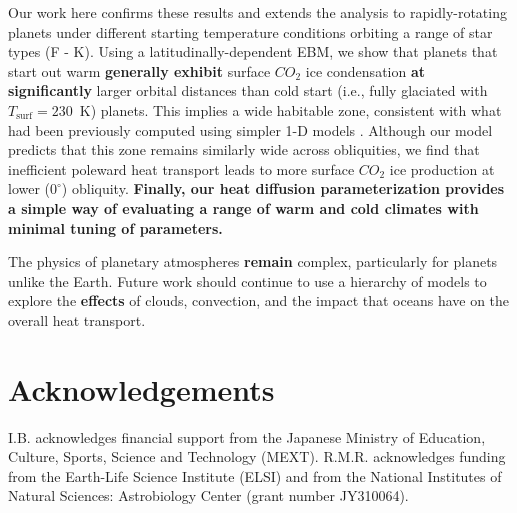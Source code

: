 \documentclass[fleqn,usenatbib]{mnras}
\providecommand{\DIFadd}[1]{{\bf #1}} %
\providecommand{\DIFdel}[1]{} %
\providecommand{\DIFaddbegin}{} %
\providecommand{\DIFaddend}{} %
\providecommand{\DIFdelbegin}{} %
\providecommand{\DIFdelend}{} %
\newcommand{\DIFscaledelfig}{0.5}
\newlength{\DIFdelgraphicswidth} %
\newlength{\DIFdelgraphicsheight} %
\newcommand{\DIFaddincludegraphics}[2][]{{\color{blue}\fbox{\DIFOincludegraphics[#1]{#2}}}} %
\newcommand{\DIFdelincludegraphics}[2][]{%
\sbox{\DIFdelgraphicsbox}{\DIFOincludegraphics[#1]{#2}}%
\settoboxwidth{\DIFdelgraphicswidth}{\DIFdelgraphicsbox} %
\settoboxtotalheight{\DIFdelgraphicsheight}{\DIFdelgraphicsbox} %
\scalebox{\DIFscaledelfig}{%
\parbox[b]{\DIFdelgraphicswidth}{\usebox{\DIFdelgraphicsbox}\\[-\baselineskip] \rule{\DIFdelgraphicswidth}{0em}}\llap{\resizebox{\DIFdelgraphicswidth}{\DIFdelgraphicsheight}{%
\setlength{\unitlength}{\DIFdelgraphicswidth}%
\begin{picture}(1,1)%
\thicklines\linethickness{2pt} %
{\color[rgb]{1,0,0}\put(0,0){\framebox(1,1){}}}%
{\color[rgb]{1,0,0}\put(0,0){\line( 1,1){1}}}%
{\color[rgb]{1,0,0}\put(0,1){\line(1,-1){1}}}%
\end{picture}%
}\hspace*{3pt}}} %
} %
\DeclareRobustCommand{\DIFaddbegin}{\DIFOaddbegin \let\includegraphics\DIFaddincludegraphics} %
\DeclareRobustCommand{\DIFaddend}{\DIFOaddend \let\includegraphics\DIFOincludegraphics} %
\DeclareRobustCommand{\DIFdelbegin}{\DIFOdelbegin \let\includegraphics\DIFdelincludegraphics} %
\DeclareRobustCommand{\DIFdelend}{\DIFOaddend \let\includegraphics\DIFOincludegraphics} %
\begin{document}
Our work here confirms these results and extends the analysis to rapidly-rotating planets under different starting temperature conditions orbiting a range of star types (F - K). Using a latitudinally-dependent EBM, we show that planets that start out warm \DIFdelbegin \DIFdel{can delay }\DIFdelend \DIFaddbegin \DIFadd{generally exhibit }\DIFaddend surface $CO_{\mathrm{2}}$ ice condensation \DIFdelbegin \DIFdel{to significantly higher $CO_{\mathrm{2}}$ pressures and }\DIFdelend \DIFaddbegin \DIFadd{at significantly }\DIFaddend larger orbital distances than \DIFdelbegin \DIFdel{can }\DIFdelend cold start (i.e., fully glaciated with $T_{\mathrm{surf}}=230$~K) planets. This implies a wide habitable zone, consistent with what had been previously computed using simpler 1-D models \citep{kasting1993,KumarKopparapu2013,Ramirez2018}. Although our model predicts that this zone remains similarly wide across obliquities, we find that inefficient poleward heat transport leads to more surface  $CO_{\mathrm{2}}$ ice production at lower ($0^{\circ}$) obliquity. \DIFaddbegin \DIFadd{Finally, our heat diffusion parameterization provides a simple way of evaluating a range of warm and cold climates with minimal tuning of parameters. 
}\DIFaddend 

The physics of planetary atmospheres \DIFdelbegin \DIFdel{remains }\DIFdelend \DIFaddbegin \DIFadd{remain }\DIFaddend complex, particularly for planets unlike the Earth. Future work should continue to use a hierarchy of models to explore the \DIFdelbegin \DIFdel{effect }\DIFdelend \DIFaddbegin \DIFadd{effects }\DIFaddend of clouds, convection, and the impact that oceans have on the overall heat transport. 

\section*{Acknowledgements}
I.B. acknowledges financial support from the Japanese Ministry of Education, Culture, Sports, Science and Technology (MEXT).
R.M.R. acknowledges funding from the Earth-Life Science Institute (ELSI) and from the National Institutes of Natural Sciences: Astrobiology Center (grant number JY310064).
\DIFdelbegin %

\DIFdelend 
\end{document}
